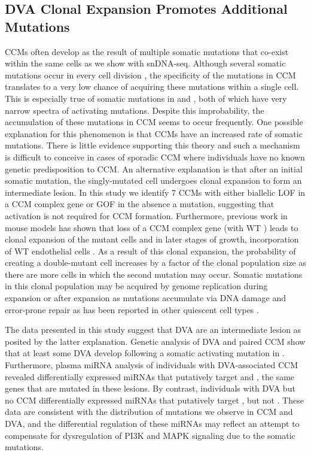\subsection{DVA Clonal Expansion Promotes Additional Mutations}
CCMs often develop as the result of multiple somatic mutations that co-exist within the same cells as we show with snDNA-seq. Although several somatic mutations occur in every cell division \citep{rodin2021}, the specificity of the mutations in CCM translates to a very low chance of acquiring these mutations within a single cell. This is especially true of somatic mutations in  and , both of which have very narrow spectra of activating mutations. Despite this improbability, the accumulation of these mutations in CCM seems to occur frequently. One possible explanation for this phenomenon is that CCMs have an increased rate of somatic mutations. There is little evidence supporting this theory and such a mechanism is difficult to conceive in cases of sporadic CCM where individuals have no known genetic predisposition to CCM. An alternative explanation is that after an initial somatic mutation, the singly-mutated cell undergoes clonal expansion to form an intermediate lesion. In this study we identify 7 CCMs with either biallelic LOF in a CCM complex gene or  GOF in the absence a  mutation, suggesting that  activation is not required for CCM formation. Furthermore, previous work in mouse models has shown that loss of a CCM complex gene (with WT ) leads to clonal expansion of the mutant cells and in later stages of growth, incorporation of WT endothelial cells \citep{detter2018, malinverno2019}. As a result of this clonal expansion, the probability of creating a double-mutant cell increases by a factor of the clonal population size as there are more cells in which the second mutation may occur. Somatic mutations in this clonal population may be acquired by genome replication during expansion or after expansion as mutations accumulate via DNA damage and error-prone repair as has been reported in other quiescent cell types \citep{lodato2018}. 

The data presented in this study suggest that DVA are an intermediate lesion as posited by the latter explanation. Genetic analysis of DVA and paired CCM show that at least some DVA develop following a somatic activating mutation in . Furthermore, plasma miRNA analysis of individuals with DVA-associated CCM revealed differentially expressed miRNAs that putatively target  and , the same genes that are mutated in these lesions. By contrast, individuals with DVA but no CCM differentially expressed miRNAs that putatively target , but not . These data are consistent with the distribution of mutations we observe in CCM and DVA, and the differential regulation of these miRNAs may reflect an attempt to compensate for dysregulation of PI3K and MAPK signaling due to the somatic mutations. 

